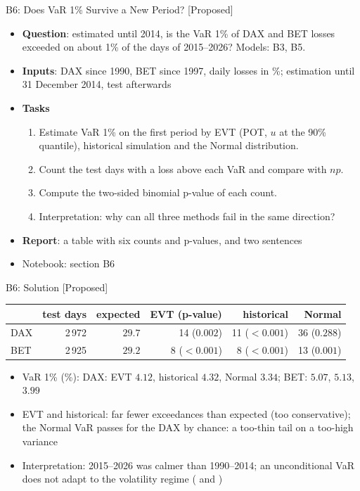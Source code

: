 \begin{frame}{B6: Does VaR 1\% Survive a New Period? [Proposed]}
\itemsize{\footnotesize}
\begin{itemize}
\item \textbf{Question}: estimated until 2014, is the VaR 1\% of DAX and BET losses exceeded on about 1\% of the days of 2015--2026? Models: B3, B5.
\item \textbf{Inputs}: DAX since 1990, BET since 1997, daily losses in \%; estimation until 31 December 2014, test afterwards
\item \textbf{Tasks}
\begin{enumerate}
    \item Estimate VaR 1\% on the first period by EVT (POT, $u$ at the 90\% quantile), historical simulation and the Normal distribution.
    \item Count the test days with a loss above each VaR and compare with $np$.
    \item Compute the two-sided binomial p-value of each count.
    \item Interpretation: why can all three methods fail in the same direction?
\end{enumerate}
\item \textbf{Report}: a table with six counts and p-values, and two sentences
\item Notebook: section B6
\end{itemize}
\end{frame}

\ifsolutions
\begin{frame}{B6: Solution [Proposed]}
\itemsize{\footnotesize}
\begin{center}
\footnotesize
\begin{tabular}{lrrrrr}
\toprule
& test days & expected & EVT (p-value) & historical & Normal \\
\midrule
DAX & 2\,972 & $29.7$ & 14 ($0.002$) & 11 ($< 0.001$) & 36 ($0.288$) \\
BET & 2\,925 & $29.2$ & 8 ($< 0.001$) & 8 ($< 0.001$) & 13 ($0.001$) \\
\bottomrule
\end{tabular}
\end{center}
\begin{itemize}
    \item VaR 1\% (\%): DAX: EVT $4.12$, historical $4.32$, Normal $3.34$; BET: $5.07$, $5.13$, $3.99$
    \item EVT and historical: far fewer exceedances than expected (too conservative); the Normal VaR passes for the DAX by chance: a too-thin tail on a too-high variance
    \item Interpretation: 2015--2026 was calmer than 1990--2014; an unconditional VaR does not adapt to the volatility regime ( and )
\end{itemize}
\end{frame}
\fi


